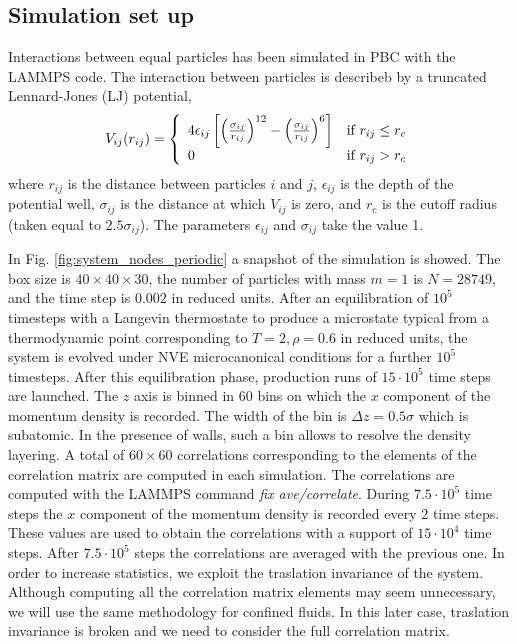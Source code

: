 \documentclass[a4paper,openright,12pt]{book}
\begin{document}
\subsection{Simulation set up}
\label{Sec:SimSetUpPBC}
Interactions between equal particles has been simulated in PBC with the LAMMPS code. The interaction between particles is describeb by a truncated Lennard-Jones (LJ) potential,
\begin{align}
  V_{ij}(r_{ij}) = \left\lbrace
  \begin{array}{ll}
    4\epsilon_{ij}\left[\left(\frac{\sigma_{ij}}{r_{ij}}\right)^{12}-\left(\frac{\sigma_{ij}}{r_{ij}}\right)^6\right] & \textup{if } r_{ij}\leq r_c \\
    0 & \textup{if } r_{ij}>r_c
  \end{array}
  \right.
  \label{LJ}
\end{align}
where $r_{ij}$ is the distance between particles $i$ and $j$, $\epsilon_{ij}$ is the depth of the potential well, $\sigma_{ij}$ is the distance at which $V_{ij}$ is zero, and $r_c$ is the cutoff radius (taken equal to $2.5\sigma_{ij}$). The parameters $\epsilon_{ij}$ and $\sigma_{ij}$ take the value 1. 

In Fig. \ref{fig:system_nodes_periodic} a snapshot of the simulation is showed.
The box  size is $40\times40\times30$, the  number of particles with mass $m=1$
is $N=28749$, and the time step is $0.002$ in reduced units.  After an
equilibration  of  $10^5$ timesteps  with  a  Langevin thermostate  to
produce a microstate typical  from a thermodynamic point corresponding
to $T=2,\rho=0.6$ in  reduced units, the system is  evolved under NVE
microcanonical conditions for a  further $10^5$ timesteps.  After this
equilibration  phase,  production  runs   of  $15\cdot 10^5$  time  steps  are
launched.   The $z$  axis is  binned  in $60$  bins on  which the  $x$
component of the momentum density is recorded.  The
width of the  bin is $\Delta z=0.5\sigma$ which is  subatomic.  In the
presence of walls,  such a bin allows to resolve  the density layering.  A total of $60\times  60$ correlations corresponding to the
elements of  the correlation matrix  are computed in  each simulation.
The correlations are computed with the LAMMPS command {\it fix ave/correlate}. During $7.5\cdot 10^5$ time steps the $x$ component of the momentum density is recorded every $2$ time steps. These values are used to obtain the correlations with a support of $15\cdot10^4$ time steps. %
After $7.5\cdot 10^5$ steps the correlations are averaged with the previous one. 
In  order to  increase  statistics,  we 
exploit   the   traslation   invariance   of   the
system.  Although computing  all the  correlation matrix  elements may
seem  unnecessary,  we will  use  the  same methodology  for  confined
fluids. In  this later  case, traslation invariance  is broken  and we
need to consider the full correlation matrix.
\end{document}
